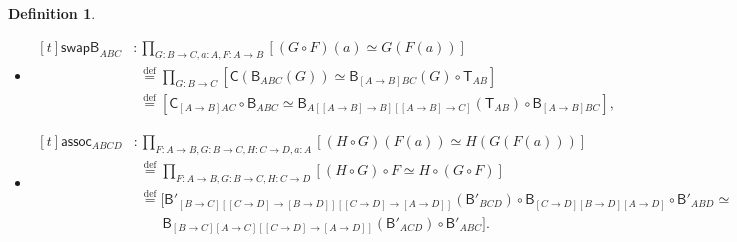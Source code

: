 \documentclass[a4paper]{article}
\theoremstyle{definition}
\newtheorem{definition}{Definition}[section]
\theoremstyle{remark}
\newcommand{\eqDef}{\overset{\text{def}}{=}}
\renewcommand{\equiv}{\simeq}
\newcommand{\nm}{\mathsf}
\newcommand{\combinator}{\nm}
\newcommand{\revAppFun}{\combinator{T}}
\newcommand{\compFun}{\combinator{B'}}
\newcommand{\revCompFun}{\combinator{B}}
\newcommand{\swapFun}{\combinator{C}}
\newcommand{\swapRevCompFun}{\nm{swapB}}
\newcommand{\compAssoc}{\nm{assoc}}
\begin{document}
\begin{definition}
\begin{itemize}
    \item $\begin{aligned}[t]
      \swapRevCompFun_{ABC} &: \prod_{G : B \to C, a : A, F : A \to B} [(G \circ F)(a) \equiv G(F(a))]\\
                            &\ \ \eqDef \prod_{G : B \to C} [\swapFun(\revCompFun_{ABC}(G)) \equiv \revCompFun_{[A{\to}B]BC}(G) \circ \revAppFun_{AB}]\\
                            &\ \ \eqDef [\swapFun_{[A{\to}B]AC} \circ \revCompFun_{ABC} \equiv \revCompFun_{A[[A{\to}B]{\to}B][[A{\to}B]{\to}C]}(\revAppFun_{AB}) \circ \revCompFun_{[A{\to}B]BC}],
    \end{aligned}$
    \item $\begin{aligned}[t]
      \compAssoc_{ABCD} &: \prod_{F : A \to B, G : B \to C, H : C \to D, a : A} [(H \circ G)(F(a)) \equiv H(G(F(a)))]\\
                        &\ \ \eqDef \prod_{F : A \to B, G : B \to C, H : C \to D} [(H \circ G) \circ F \equiv H \circ (G \circ F)]\\
                        &\ \ \eqDef [\compFun_{[B{\to}C][[C{\to}D]{\to}[B{\to}D]][[C{\to}D]{\to}[A{\to}D]]}(\compFun_{BCD}) \circ \revCompFun_{[C{\to}D][B{\to}D][A{\to}D]} \circ \compFun_{ABD} \equiv\\
                        &\ \ \quad\ \ \,\revCompFun_{[B{\to}C][A{\to}C][[C{\to}D]{\to}[A{\to}D]]}(\compFun_{ACD}) \circ \compFun_{ABC}].
    \end{aligned}$
  \end{itemize}


\end{definition}
\end{document}
